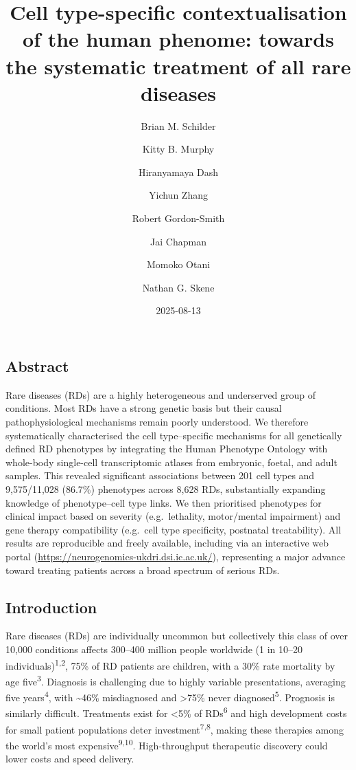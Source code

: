\documentclass[
]{article}
\title{Cell type-specific contextualisation of the human phenome:
towards the systematic treatment of all rare diseases}
\author{Brian M. Schilder \and Kitty B. Murphy \and Hiranyamaya
Dash \and Yichun Zhang \and Robert Gordon-Smith \and Jai
Chapman \and Momoko Otani \and Nathan G. Skene}
\date{2025-08-13}
\begin{document}
\maketitle


\newpage

\subsection{Abstract}\label{abstract}

Rare diseases (RDs) are a highly heterogeneous and underserved group of
conditions. Most RDs have a strong genetic basis but their causal
pathophysiological mechanisms remain poorly understood. We therefore
systematically characterised the cell type--specific mechanisms for all
genetically defined RD phenotypes by integrating the Human Phenotype
Ontology with whole-body single-cell transcriptomic atlases from
embryonic, foetal, and adult samples. This revealed significant
associations between 201 cell types and 9,575/11,028 (86.7\%) phenotypes
across 8,628 RDs, substantially expanding knowledge of phenotype--cell
type links. We then prioritised phenotypes for clinical impact based on
severity (e.g.~lethality, motor/mental impairment) and gene therapy
compatibility (e.g.~cell type specificity, postnatal treatability). All
results are reproducible and freely available, including via an
interactive web portal
(\url{https://neurogenomics-ukdri.dsi.ic.ac.uk/}), representing a major
advance toward treating patients across a broad spectrum of serious RDs.

\subsection{Introduction}\label{sec-introduction}

Rare diseases (RDs) are individually uncommon but collectively this
class of over 10,000 conditions affects 300--400 million people
worldwide (1 in 10--20 individuals)\textsuperscript{1,2}, 75\% of RD
patients are children, with a 30\% rate mortality by age
five\textsuperscript{3}. Diagnosis is challenging due to highly variable
presentations, averaging five years\textsuperscript{4}, with
\textasciitilde46\% misdiagnosed and \textgreater75\% never
diagnosed\textsuperscript{5}. Prognosis is similarly difficult.
Treatments exist for \textless5\% of RDs\textsuperscript{6} and high
development costs for small patient populations deter
investment\textsuperscript{7,8}, making these therapies among the
world's most expensive\textsuperscript{9,10}. High-throughput
therapeutic discovery could lower costs and speed delivery.
\end{document}
